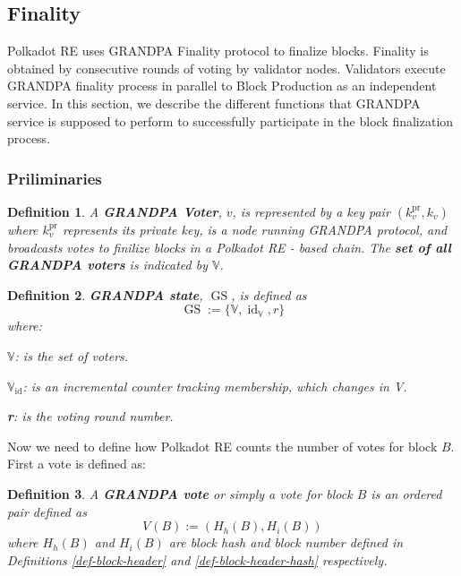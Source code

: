 \documentclass{article}
\newcommand{\assign}{:=}
\newcommand{\nosymbol}{}
\newcommand{\tmop}[1]{\ensuremath{\operatorname{#1}}}
\newcommand{\tmstrong}[1]{\textbf{#1}}
\newcommand{\tmtextbf}[1]{{\bfseries{#1}}}
\newtheorem{definition}{Definition}
\providecommand{\nosymbol}{}
\providecommand{\tmop}[1]{\ensuremath{\mathrm{#1}}}
\providecommand{\tmstrong}[1]{\tmtextbf{#1}}
\providecommand{\tmtextbf}[1]{\tmtextbf{#1}}
\newtheorem{definition}{Definition}
\begin{document}
\subsection{Finality}

Polkadot RE uses GRANDPA Finality protocol {\cite{AlSt19-Grandpai}} to
finalize blocks. Finality is obtained by consecutive rounds of voting by
validator nodes. Validators execute GRANDPA finality process in parallel to
Block Production as an independent service. In this section, we describe the
different functions that GRANDPA service is supposed to perform to
successfully participate in the block finalization process.

\subsubsection{Priliminaries}

\begin{definition}
  A {\tmstrong{GRANDPA Voter}}, $v$, is represented by a key pair
  $(k^{\tmop{pr}}_v, k_v)$ where $k_v^{\tmop{pr}}$ represents its private key,
  is a node running GRANDPA protocol, and broadcasts votes to finilize blocks
  in a Polkadot RE - based chain. The {\tmstrong{set of all GRANDPA voters}}
  is indicated by $\mathbb{V}$.
\end{definition}

\begin{definition}
  {\tmstrong{GRANDPA state}}, $\tmop{GS}$, is defined as
  \[ \tmop{GS} \assign \{\mathbb{V}, \tmop{id}_{\mathbb{V}}, r\} \]
  where:
  
  $\mathbb{V}$: is the set of voters.
  
  {\tmstrong{$\mathbb{V}_{\tmop{id}}$}}: is an incremental counter tracking
  membership, which changes in V.
  
  {\tmstrong{r}}: is the voting round number.
\end{definition}

Now we need to define how Polkadot RE counts the number of votes for block
$B$. First a vote is defined as:

\begin{definition}
  \label{def-vote}A {\tmstrong{GRANDPA vote }}or simply a vote for block $B$
  is an ordered pair defined as
  \[ V_{\nosymbol} (B) \assign (H_h (B), H_i (B)) \]
  where $H_h (B)$ and $H_i (B)$ are block hash and block number defined in
  Definitions \ref{def-block-header} and \ref{def-block-header-hash}
  respectively.
\end{definition}
\end{document}
